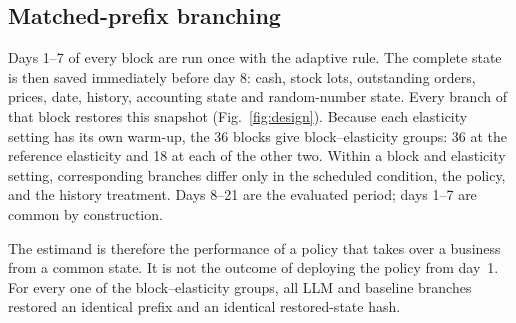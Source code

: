 \documentclass[runningheads]{llncs}
\begin{document}
\subsection{Matched-prefix branching}

Days 1--7 of every block are run once with the adaptive rule. The complete state is then saved immediately before day 8: cash, stock lots, outstanding orders, prices, date, history, accounting state and random-number state. Every branch of that block restores this snapshot (Fig.~\ref{fig:design}). Because each elasticity setting has its own warm-up, the 36 blocks give  block--elasticity groups: 36 at the reference elasticity and 18 at each of the other two. Within a block and elasticity setting, corresponding branches differ only in the scheduled condition, the policy, and the history treatment. Days 8--21 are the evaluated period; days 1--7 are common by construction.

The estimand is therefore the performance of a policy that takes over a business from a common state. It is not the outcome of deploying the policy from day~1. For every one of the  block--elasticity groups, all  LLM and  baseline branches restored an identical prefix and an identical restored-state hash.
\end{document}
